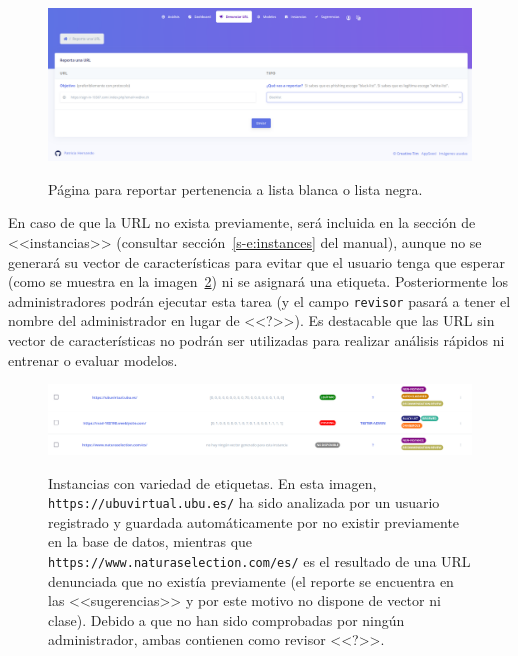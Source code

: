 \begin{figure}[h]
	\caption[Manual de usuario: reportar pertenencia a lista]{Página para reportar pertenencia a lista blanca o lista negra.}
	\centering
	\includegraphics[width=\textwidth]{../img/anexos/user_guide/4_report_url}
	\label{e-3:report-url}
\end{figure}

En caso de que la URL no exista previamente, será incluida en la sección de <<instancias>> (consultar sección~\ref{s-e:instances} del manual), aunque no se generará su vector de características para evitar que el usuario tenga que esperar (como se muestra en la imagen~\ref{e-6:more-labels}) ni se asignará una etiqueta. Posteriormente los administradores podrán ejecutar esta tarea (y el campo \texttt{revisor} pasará a tener el nombre del administrador en lugar de <<?>>). Es destacable que las URL sin vector de características no podrán ser utilizadas para realizar análisis rápidos ni entrenar o evaluar modelos.

\begin{figure}[h]
	\caption[Manual de usuario: ejemplos de etiquetas]{Instancias con variedad de etiquetas. En esta imagen, \texttt{https://ubuvirtual.ubu.es/} ha sido analizada por un usuario registrado y guardada automáticamente por no existir previamente en la base de datos, mientras que \texttt{https://www.naturaselection.com/es/} es el resultado de una URL denunciada que no existía previamente (el reporte se encuentra en las <<sugerencias>> y por este motivo no dispone de vector ni clase). Debido a que no han sido comprobadas por ningún administrador, ambas contienen como revisor <<?>>.}
	\centering
	\includegraphics[width=\textwidth]{../img/anexos/user_guide/6_instances_more_labels}
	\label{e-6:more-labels}
\end{figure}


